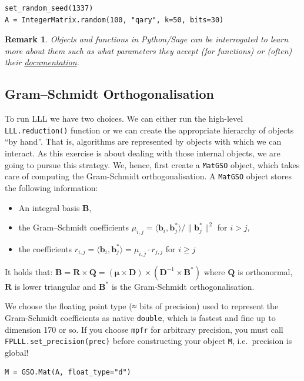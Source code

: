 \documentclass[10pt,a4paper,nobib]{tufte-handout}
\newtheorem{remark}{Remark}
\renewcommand{\vec}[1]{\ensuremath{\mathbf{#1}}\xspace}
\providecommand{\mat}[1]{\ensuremath{\vec{#1}}\xspace}
\begin{document}
\lstset{language=Python,label= ,caption= ,captionpos=b,numbers=none}
\begin{lstlisting}
set_random_seed(1337)
A = IntegerMatrix.random(100, "qary", k=50, bits=30)
\end{lstlisting}

\begin{remark}
Objects and functions in Python/Sage can be interrogated to learn more about them such as what parameters they accept (for functions) or (often) their \href{https://doc.sagemath.org/html/en/tutorial/tour\_help.html}{documentation}.
\end{remark}

\subsection{Gram–Schmidt Orthogonalisation}
\label{sec:org206f313}

To run LLL we have two choices. We can either run the high-level \texttt{LLL.reduction()} function or we can create the appropriate hierarchy of objects “by hand”. That is, algorithms are represented by objects with which we can interact. As this exercise is about dealing with those internal objects, we are going to pursue this strategy. We, hence, first create a \texttt{MatGSO} object, which takes care of computing the Gram-Schmidt orthogonalisation. A \texttt{MatGSO} object stores the following information:
\begin{itemize}
\item An integral basis \(\mat{B}\),
\item the Gram--Schmidt coefficients \(μ_{i,j} = ⟨\vec{b}_i, \vec{b}^*_j⟩ / \|\vec{b}^*_j\|^2\) for \(i>j\),
\item the coefficients \(r_{i,j} = ⟨\vec{b}_i, \vec{b}^*_j⟩ = μ_{i,j} ⋅ r_{j,j}\) for \(i\geq j\)
\end{itemize}
It holds that: \(\mat{B} = \mat{R} × \mat{Q} = (\mat{μ} × \mat{D}) × (\mat{D}^{-1} × \mat{B}^*)\) where \(\mat{Q}\) is orthonormal, \(\mat{R}\) is lower triangular and \(\mat{B}^*\) is the Gram-Schmidt orthogonalisation.

We choose the floating point type (≈ bits of precision) used to represent the Gram-Schmidt coefficients as native \texttt{double}, which is fastest and fine up to dimension 170 or so. If you choose \texttt{mpfr} for arbitrary precision, you must call \texttt{FPLLL.set\_precision(prec)} before constructing your object \texttt{M}, i.e. precision is global!

\lstset{language=Python,label= ,caption= ,captionpos=b,numbers=none}
\begin{lstlisting}
M = GSO.Mat(A, float_type="d")
\end{lstlisting}
\end{document}
